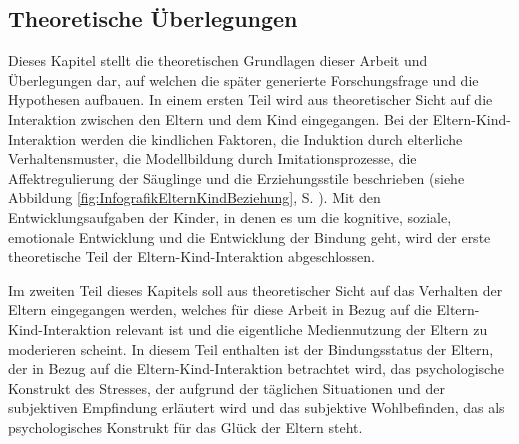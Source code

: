 \subsection{Theoretische Überlegungen}\label{sec:TheretischeÜberlegungen}
Dieses Kapitel stellt die theoretischen Grundlagen dieser Arbeit und Überlegungen dar, auf welchen die später generierte Forschungsfrage und die Hypothesen aufbauen. 
In einem ersten Teil wird aus theoretischer Sicht auf die Interaktion zwischen den Eltern und dem Kind eingegangen. Bei der Eltern-Kind-Interaktion werden die kindlichen Faktoren, die Induktion durch elterliche Verhaltensmuster, die Modellbildung durch Imitationsprozesse, die Affektregulierung der Säuglinge und die Erziehungsstile beschrieben (siehe Abbildung \ref{fig:InfografikElternKindBeziehung}, S. \pageref{fig:InfografikElternKindBeziehung}). Mit den Entwicklungsaufgaben der Kinder, in denen es um die kognitive, soziale, emotionale Entwicklung und die Entwicklung der Bindung geht, wird der erste theoretische Teil der Eltern-Kind-Interaktion abgeschlossen.

Im zweiten Teil dieses Kapitels soll aus theoretischer Sicht auf das Verhalten der Eltern eingegangen werden, welches für diese Arbeit in Bezug auf die Eltern-Kind-Interaktion relevant ist und die eigentliche Mediennutzung der Eltern zu moderieren scheint. In diesem Teil enthalten ist der Bindungsstatus der Eltern, der in Bezug auf die Eltern-Kind-Interaktion betrachtet wird, das psychologische Konstrukt des Stresses, der aufgrund der täglichen Situationen und der subjektiven Empfindung erläutert wird und das subjektive Wohlbefinden, das als psychologisches Konstrukt für das Glück der Eltern steht.


